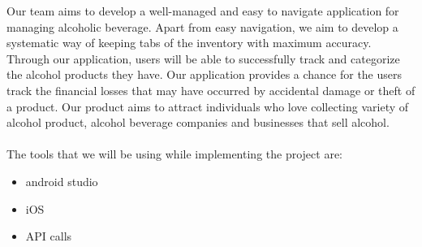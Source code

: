 Our team aims to develop a well-managed and easy to navigate application for managing
alcoholic beverage. Apart from easy navigation, we aim to develop a systematic way of keeping
tabs of the inventory with maximum accuracy. Through our application, users will be able to
successfully track and categorize the alcohol products they have. Our application provides a
chance for the users track the financial losses that may have occurred by accidental damage or
theft of a product. Our product aims to attract individuals who love collecting variety of alcohol
product, alcohol beverage companies and businesses that sell alcohol.
\\
\\
The tools that we will be using while implementing the project are:
\begin{itemize}
  \item android studio
  \item iOS
  \item API calls
\end{itemize}